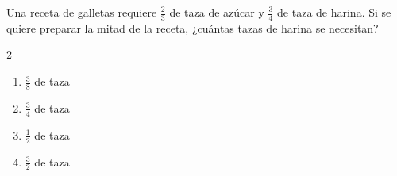 Una receta de galletas requiere $\frac{2}{3}$ de taza de azúcar y $\frac{3}{4}$ de taza de harina. Si se quiere preparar la mitad de la receta, ¿cuántas tazas de harina se necesitan?
\begin{multicols}{2}
\begin{enumerate}[label=\alph*)]
\item $\frac{3}{8}$ de taza
\item $\frac{3}{4}$ de taza
\item $\frac{1}{2}$ de taza
\item $\frac{3}{2}$ de taza
\end{enumerate}
\end{multicols}